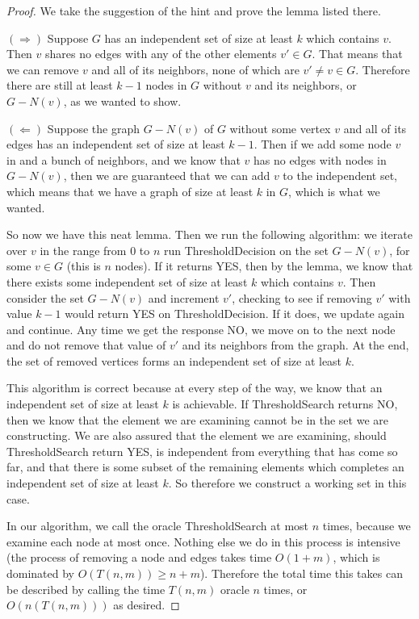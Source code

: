 \documentclass[11pt]{article}
\begin{document}
\begin{enumerate}
\begin{enumerate}
\begin{proof}
We take the suggestion of the hint and prove the lemma listed there.

$(\Longrightarrow)$ Suppose $G$ has an independent set of size at least $k$ which contains $v$. Then $v$ shares no edges with any of the other elements $v' \in G$. That means that we can remove $v$ and all of its neighbors, none of which are $v' \neq v \in G$. Therefore there are still at least $k - 1$ nodes in $G$ without $v$ and its neighbors, or $G - N(v)$, as we wanted to show.

$(\Longleftarrow)$ Suppose the graph $G - N(v)$ of $G$ without some vertex $v$ and all of its edges has an independent set of size at least $k - 1$. Then if we add some node $v$ in and a bunch of neighbors, and we know that $v$ has no edges with nodes in $G - N(v)$, then we are guaranteed that we can add $v$ to the independent set, which means that we have a graph of size at least $k$ in $G$, which is what we wanted.

So now we have this neat lemma. Then we run the following algorithm: we iterate over $v$ in the range from $0$ to $n$ run ThresholdDecision on the set $G - N(v)$, for some $v \in G$ (this is $n$ nodes). If it returns YES, then by the lemma, we know that there exists some independent set of size at least $k$ which contains $v$. Then consider the set $G - N(v)$ and increment $v'$, checking to see if removing $v'$ with value $k - 1$ would return YES on ThresholdDecision. If it does, we update again and continue. Any time we get the response NO, we move on to the next node and do not remove that value of $v'$ and its neighbors from the graph. At the end, the set of removed vertices forms an independent set of size at least $k$.

This algorithm is correct because at every step of the way, we know that an independent set of size at least $k$ is achievable. If ThresholdSearch returns NO, then we know that the element we are examining cannot be in the set we are constructing. We are also assured that the element we are examining, should ThresholdSearch return YES, is independent from everything that has come so far, and that there is some subset of the remaining elements which completes an independent set of size at least $k$. So therefore we construct a working set in this case.

In our algorithm, we call the oracle ThresholdSearch at most $n$ times, because we examine each node at most once. Nothing else we do in this process is intensive (the process of removing a node and edges takes time $O(1 + m)$, which is dominated by $O(T(n, m)) \geq n + m$). Therefore the total time this takes can be described by calling the time $T(n, m)$ oracle $n$ times, or $O(n (T(n, m)))$ as desired.
\end{proof}


\end{enumerate}
\end{enumerate}
\end{document}
